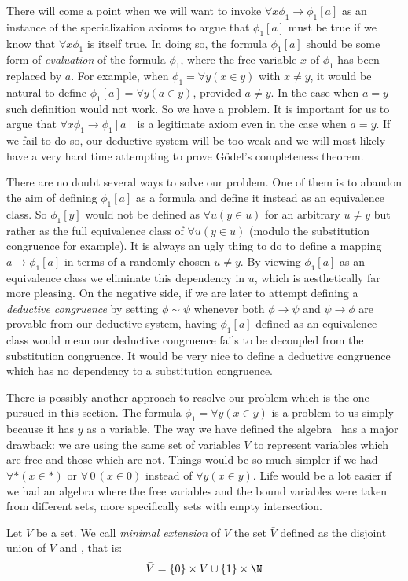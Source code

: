 There will come a point when we will want to invoke $\forall
x\phi_{1}\to\phi_{1}[a]$ as an instance of the specialization axioms
to argue that $\phi_{1}[a]$ must be true if we know that $\forall
x\phi_{1}$ is itself true. In doing so, the formula $\phi_{1}[a]$
should be some form of {\em evaluation} of the formula $\phi_{1}$,
where the free variable $x$ of $\phi_{1}$ has been replaced by $a$.
For example, when $\phi_{1}=\forall y(x\in y)$ with $x\neq y$, it
would be natural to define $\phi_{1}[a]=\forall y(a\in y)$, provided
$a\neq y$. In the case when $a=y$ such definition would not work. So
we have a problem. It is important for us to argue that $\forall
x\phi_{1}\to\phi_{1}[a]$ is a legitimate axiom even in the case when
$a=y$. If we fail to do so, our deductive system will be too weak
and we will most likely have a very hard time attempting to prove
G\"odel's completeness theorem.

There are no doubt several ways to solve our problem. One of them is
to abandon the aim of defining $\phi_{1}[a]$ as a formula and define
it instead as an equivalence class. So $\phi_{1}[y]$ would not be
defined as $\forall u(y\in u)$ for an arbitrary $u\neq y$ but rather
as the full equivalence class of $\forall u(y\in u)$ (modulo the
substitution congruence for example). It is always an ugly thing to
do to define a mapping $a\to\phi_{1}[a]$ in terms of a randomly
chosen $u\neq y$. By viewing $\phi_{1}[a]$ as an equivalence class
we eliminate this dependency in $u$, which is aesthetically far more
pleasing. On the negative side, if we are later to attempt defining
a {\em deductive congruence} by setting  $\phi\sim\psi$ whenever
both $\phi\to\psi$ and $\psi\to\phi$ are provable from our deductive
system, having $\phi_{1}[a]$ defined as an equivalence class would
mean our deductive congruence fails to be decoupled from the
substitution congruence. It would be very nice to define a deductive
congruence which has no dependency to a substitution congruence.

There is possibly another approach to resolve our problem which is
the one pursued in this section. The formula $\phi_{1}=\forall
y(x\in y)$ is a problem to us simply because it has $y$ as a
variable. The way we have defined the algebra \pv\ has a major
drawback: we are using the same set of variables $V$ to represent
variables which are free and those which are not. Things would be so
much simpler if we had $\forall *(x\in *)$ or $\forall\,0\,(x\in 0)$
instead of $\forall y(x\in y)$. Life would be a lot easier if we had
an algebra where the free variables and the bound variables were
taken from different sets, more specifically sets with empty
intersection.
\begin{defin}\label{logic:def:FOPL:mintransform:minextension:set}
Let $V$ be a set. We call {\em minimal extension} of $V$ the set
$\bar{V}$ defined as the disjoint union of $V$ and \N, that is:
    \[
    \bar{V}=\{0\}\times V\cup \{1\}\times\N
    \]
\end{defin}

